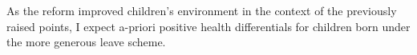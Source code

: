 \documentclass[11pt, a4paper,draft]{article} %
\begin{document}
As the reform improved children's environment in the context of the previously raised points, I expect a-priori positive health differentials for children born under the more generous leave scheme.
















\end{document}
